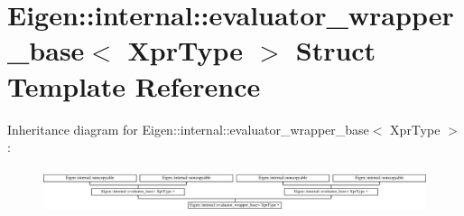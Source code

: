 \hypertarget{struct_eigen_1_1internal_1_1evaluator__wrapper__base}{}\section{Eigen\+:\+:internal\+:\+:evaluator\+\_\+wrapper\+\_\+base$<$ Xpr\+Type $>$ Struct Template Reference}
\label{struct_eigen_1_1internal_1_1evaluator__wrapper__base}
Inheritance diagram for Eigen\+:\+:internal\+:\+:evaluator\+\_\+wrapper\+\_\+base$<$ Xpr\+Type $>$\+:\begin{figure}[H]
\begin{center}
\leavevmode
\includegraphics[height=1.312500cm]{struct_eigen_1_1internal_1_1evaluator__wrapper__base}
\end{center}
\end{figure}
